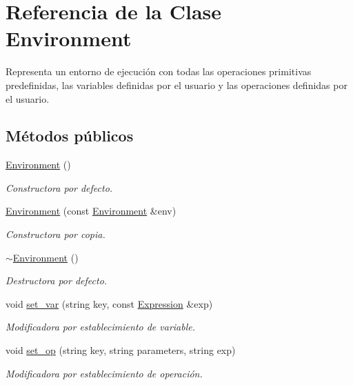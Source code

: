 \hypertarget{class_environment}{}\section{Referencia de la Clase Environment}
\label{class_environment}


Representa un entorno de ejecución con todas las operaciones primitivas predefinidas, las variables definidas por el usuario y las operaciones definidas por el usuario.  


\subsection*{Métodos públicos}
\begin{DoxyCompactItemize}
\item 
\hyperlink{class_environment_a8b427c4448d8b7536666837521b9e83d}{Environment} ()
\begin{DoxyCompactList}\small\item\em Constructora por defecto. \end{DoxyCompactList}\item 
\hyperlink{class_environment_a98117750fb7003d9def6a5d546630ce5}{Environment} (const \hyperlink{class_environment}{Environment} \&env)
\begin{DoxyCompactList}\small\item\em Constructora por copia. \end{DoxyCompactList}\item 
\hyperlink{class_environment_a8e294735187880dd3d59be10c425b29d}{$\sim$\+Environment} ()
\begin{DoxyCompactList}\small\item\em Destructora por defecto. \end{DoxyCompactList}\item 
void \hyperlink{class_environment_a6555e2858047d34b19261518e2ec47ce}{set\+\_\+var} (string key, const \hyperlink{class_expression}{Expression} \&exp)
\begin{DoxyCompactList}\small\item\em Modificadora por establecimiento de variable. \end{DoxyCompactList}\item 
void \hyperlink{class_environment_abcfe3cc83f17d704cc51efb2e6a4c3b8}{set\+\_\+op} (string key, string parameters, string exp)
\begin{DoxyCompactList}\small\item\em Modificadora por establecimiento de operación. \end{DoxyCompactList}\item 

\end{DoxyCompactItemize}

